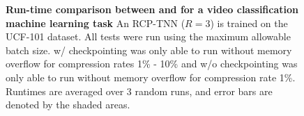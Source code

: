 \begin{figure}[!htbp]
\vspace{-1em}
\begin{minipage}[b]{.5\linewidth}
\centering
\resizebox{\textwidth}{!}{
   
    }
\label{fig:video-rcp-vs-pytorch-train-spatial}
\end{minipage}%
\hfill
\begin{minipage}[b]{.5\linewidth}
\centering
\resizebox{\textwidth}{!}{
    
    }
\label{fig:video-rcp-vs-pytorch-test-spatial}
\end{minipage}
\begin{minipage}[b]{.5\linewidth}
\centering
\resizebox{\textwidth}{!}{
   
    }
\label{fig:video-rcp-vs-pytorch-train-temporal}
\vspace{-1em}
\end{minipage}%
\hfill
\begin{minipage}[b]{.5\linewidth}
\centering
\resizebox{\textwidth}{!}{
    
    }
\label{fig:video-rcp-vs-pytorch-test-temporal}
\vspace{-1em}
\end{minipage}
\caption{\textbf{Run-time comparison between \conveinsum and \pytorch for a video classification machine learning task} An RCP-TNN ($R=3$) is trained on the UCF-101 dataset. All tests were run using the maximum allowable batch size. \pytorch w/ checkpointing was only able to run without memory overflow for compression rates 1\% - 10\% and \pytorch w/o checkpointing was only able to run without memory overflow for compression rate 1\%. Runtimes are averaged over 3 random runs, and error bars are denoted by the shaded areas. }\label{fig:video-rcp-vs-pytorch}
\vspace{-1em}
\end{figure}